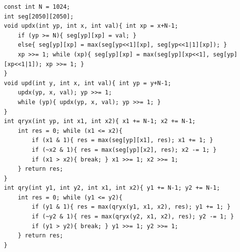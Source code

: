 \begin{verbatim}
const int N = 1024;
int seg[2050][2050];
void updx(int yp, int x, int val){ int xp = x+N-1;
	if (yp >= N){ seg[yp][xp] = val; }
	else{ seg[yp][xp] = max(seg[yp<<1][xp], seg[yp<<1|1][xp]); }
	xp >>= 1; while (xp){ seg[yp][xp] = max(seg[yp][xp<<1], seg[yp][xp<<1|1]); xp >>= 1; }
}
void upd(int y, int x, int val){ int yp = y+N-1;
	updx(yp, x, val); yp >>= 1;
	while (yp){ updx(yp, x, val); yp >>= 1; }
}
int qryx(int yp, int x1, int x2){ x1 += N-1; x2 += N-1;
	int res = 0; while (x1 <= x2){
		if (x1 & 1){ res = max(seg[yp][x1], res); x1 += 1; }
		if (~x2 & 1){ res = max(seg[yp][x2], res); x2 -= 1; }
		if (x1 > x2){ break; } x1 >>= 1; x2 >>= 1;
	} return res;
}
int qry(int y1, int y2, int x1, int x2){ y1 += N-1; y2 += N-1;
	int res = 0; while (y1 <= y2){
		if (y1 & 1){ res = max(qryx(y1, x1, x2), res); y1 += 1; }
		if (~y2 & 1){ res = max(qryx(y2, x1, x2), res); y2 -= 1; }
		if (y1 > y2){ break; } y1 >>= 1; y2 >>= 1;
	} return res;
}
\end{verbatim}